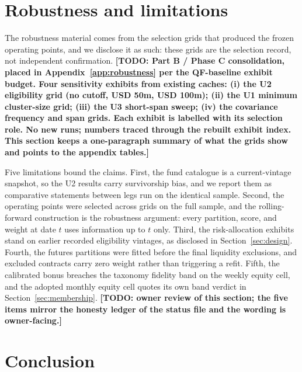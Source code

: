 \documentclass[11pt]{article}
\theoremstyle{remark}
\newcommand{\TODO}[1]{\textbf{[TODO: #1]}}
\begin{document}
\section{Robustness and limitations}
\label{sec:robustness}

The robustness material comes from the selection grids that produced the
frozen operating points, and we disclose it as such: these grids are the
selection record, not independent confirmation. \TODO{Part B / Phase C
consolidation, placed in Appendix~\ref{app:robustness} per the QF-baseline
exhibit budget. Four sensitivity exhibits from existing caches: (i) the U2
eligibility grid (no cutoff, USD 50m, USD 100m); (ii) the U1 minimum
cluster-size grid; (iii) the U3 short-span sweep; (iv) the covariance
frequency and span grids. Each exhibit is labelled with its selection role.
No new runs; numbers traced through the rebuilt exhibit index. This section
keeps a one-paragraph summary of what the grids show and points to the
appendix tables.}

\label{sec:limitations}
Five limitations bound the claims. First, the fund catalogue is a
current-vintage snapshot, so the U2 results carry survivorship bias, and we
report them as comparative statements between legs run on the identical
sample. Second, the operating points were selected across grids on the full
sample, and the rolling-forward construction is the robustness argument: every
partition, score, and weight at date $t$ uses information up to $t$ only.
Third, the risk-allocation exhibits stand on earlier recorded eligibility
vintages, as disclosed in Section~\ref{sec:design}. Fourth, the futures
partitions were fitted before the final liquidity exclusions, and excluded
contracts carry zero weight rather than triggering a refit. Fifth, the
calibrated bonus breaches the taxonomy fidelity band on the weekly equity
cell, and the adopted monthly equity cell quotes its own band verdict in
Section~\ref{sec:membership}. \TODO{owner review of this section; the five
items mirror the honesty ledger of the status file and the wording is
owner-facing.}

\section{Conclusion}
\label{sec:conclusion}
\end{document}
